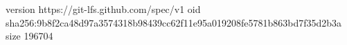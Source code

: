 version https://git-lfs.github.com/spec/v1
oid sha256:9b8f2ca48d97a3574318b98439cc62f11e95a019208fe5781b863bd7f35d2b3a
size 196704
